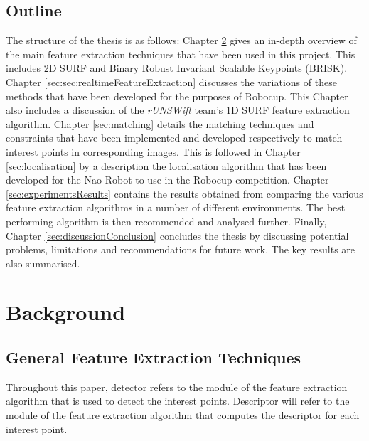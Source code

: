 \documentclass[11pt]{report}
\begin{document}
\section{Outline}
\label{sec:outline}
The structure of the thesis is as follows: Chapter \ref{sec:background} gives an in-depth overview of the main feature extraction techniques that have been used in this project. This includes 2D SURF and Binary Robust Invariant Scalable Keypoints (BRISK). Chapter \ref{sec:sec:realtimeFeatureExtraction} discusses the variations of these methods that have been developed for the purposes of Robocup. This Chapter also includes a discussion of the \textit{rUNSWift} team's 1D SURF feature extraction algorithm. Chapter \ref{sec:matching} details the matching techniques and constraints that have been implemented and developed respectively to match interest points in corresponding images. This is followed in Chapter \ref{sec:localisation} by a description the localisation algorithm that has been developed for the Nao Robot to use in the Robocup competition. Chapter \ref{sec:experimentsResults} contains the results obtained from comparing the various feature extraction algorithms in a number of different environments. The best performing algorithm is then recommended and analysed further. Finally, Chapter \ref{sec:discussionConclusion} concludes the thesis by discussing potential problems, limitations and recommendations for future work. The key results are also summarised.\\



\chapter{Background}
\label{sec:background}

\section{General Feature Extraction Techniques}
\label{sec:genFeatureExtract}

Throughout this paper, detector refers to the module of the feature extraction algorithm that is used to detect the interest points. Descriptor will refer to the module of the feature extraction algorithm that computes the descriptor for each interest point.\\
\end{document}
